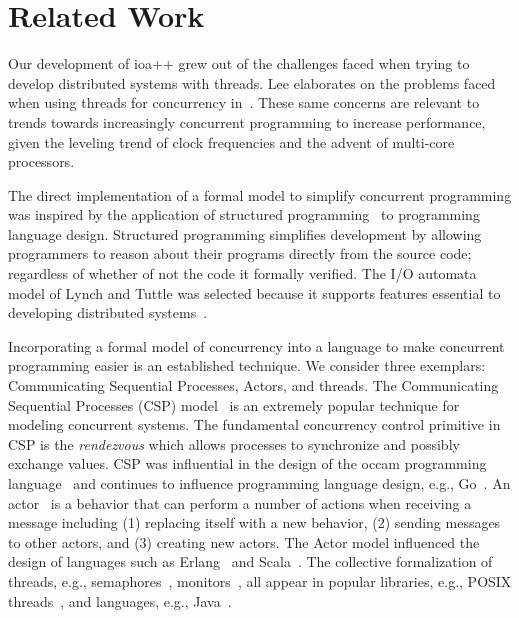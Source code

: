 \section{Related Work\label{related_work}}

Our development of ioa++ grew out of the challenges faced when trying to develop distributed systems with threads.
Lee elaborates on the problems faced when using threads for concurrency in~\cite{lee2006problem}.
These same concerns are relevant to trends towards increasingly concurrent programming to increase performance, given the leveling trend of clock frequencies and the advent of multi-core processors\cite{sutter2005software}.

The direct implementation of a formal model to simplify concurrent programming was inspired by the application of structured programming~\cite{dijkstra1968letters} to programming language design.
Structured programming simplifies development by allowing programmers to reason about their programs directly from the source code; regardless of whether of not the code it formally verified.
The I/O automata model of Lynch and Tuttle\cite{lynch1987hierarchical} was selected because it supports features essential to developing distributed systems~\cite{lynch1996distributed}.

Incorporating a formal model of concurrency into a language to make concurrent programming easier is an established technique.
We consider three exemplars:  Communicating Sequential Processes, Actors, and threads.
The Communicating Sequential Processes (CSP) model~\cite{hoare1978communicating} is an extremely popular technique for modeling concurrent systems.
The fundamental concurrency control primitive in CSP is the \emph{rendezvous} which allows processes to synchronize and possibly exchange values.
CSP was influential in the design of the occam programming language~\cite{jones1987programming} and continues to influence programming language design, e.g., Go~\cite{go}.
An actor~\cite{agha1986actors} is a behavior that can perform a number of actions when receiving a message including (1) replacing itself with a new behavior, (2) sending messages to other actors, and (3) creating new actors.
The Actor model influenced the design of languages such as Erlang~\cite{armstrong1996concurrent} and Scala~\cite{odersky2004overview}.
The collective formalization of threads, e.g., semaphores~\cite{dijkstra1968cooperating}, monitors~\cite{hoare1974monitors}, all appear in popular libraries, e.g., POSIX threads~\cite{butenhof1997programming}, and languages, e.g., Java~\cite{christopher2000high}.

